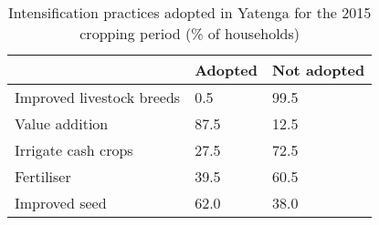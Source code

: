 \begin{table}[H]
  \captionsetup{singlelinecheck = false, justification=justified}
  \caption{Intensification practices adopted in Yatenga for the 2015 cropping period (\% of households)}
  \label{tab:B3}
  \small
\begin{tabularx}{\textwidth}{@{}lYY@{}}
\toprule
 & Adopted & Not adopted \\
 \midrule
Improved livestock breeds & 0.5 & 99.5 \\
Value addition & 87.5 & 12.5 \\
Irrigate cash crops & 27.5 & 72.5 \\
Fertiliser & 39.5 & 60.5 \\
Improved seed & 62.0 & 38.0 \\
\bottomrule
\end{tabularx}
\end{table}
